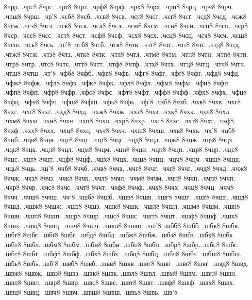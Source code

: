 {8чрр.
.чрс8
8чрс.
.чрт8
8чрт.
.чрф8
8чрф.
.чрх8
8чрх.
.чрц8
8чрц.
.чрч8
8чрч.
.чрш8
8чрш.
.чр'8
.чсб8
8чсб.
.чсв8
8чсв.
.чсг8
8чсг.
.чсґ8
8чсґ.
.чсд8
8чсд.
.чсж8
8чсж.
.чсз8
8чсз.
.чск8
8чск.
.чсл8
8чсл.
.чсм8
8чсм.
.чсн8
8чсн.
.чсп8
8чсп.
.чср8
8чср.
.чсс8
8чсс.
.чст8
8чст.
.чсф8
8чсф.
.чсх8
8чсх.
.чсц8
8чсц.
.чсч8
8чсч.
.чсш8
8чсш.
.чсь8
8чсь.
.чс'8
.чтб8
8чтб.
.чтв8
8чтв.
.чтг8
8чтг.
.чтґ8
8чтґ.
.чтд8
8чтд.
.чтж8
8чтж.
.чтз8
8чтз.
.чтк8
8чтк.
.чтл8
8чтл.
.чтм8
8чтм.
.чтн8
8чтн.
.чтп8
8чтп.
.чтр8
8чтр.
.чтс8
8чтс.
.чтт8
8чтт.
.чтф8
8чтф.
.чтх8
8чтх.
.чтц8
8чтц.
.чтч8
8чтч.
.чтш8
8чтш.
.чт'8
.чфб8
8чфб.
.чфв8
8чфв.
.чфг8
8чфг.
.чфґ8
8чфґ.
.чфд8
8чфд.
.чфж8
8чфж.
.чфз8
8чфз.
.чфк8
8чфк.
.чфл8
8чфл.
.чфм8
8чфм.
.чфн8
8чфн.
.чфп8
8чфп.
.чфр8
8чфр.
.чфс8
8чфс.
.чфт8
8чфт.
.чфф8
8чфф.
.чфх8
8чфх.
.чфц8
8чфц.
.чфч8
8чфч.
.чфш8
8чфш.
.чфь8
8чфь.
.чф'8
.чхб8
8чхб.
.чхв8
8чхв.
.чхг8
8чхг.
.чхґ8
8чхґ.
.чхд8
8чхд.
.чхж8
8чхж.
.чхз8
8чхз.
.чхк8
8чхк.
.чхл8
8чхл.
.чхм8
8чхм.
.чхн8
8чхн.
.чхп8
8чхп.
.чхр8
8чхр.
.чхс8
8чхс.
.чхт8
8чхт.
.чхф8
8чхф.
.чхх8
8чхх.
.чхц8
8чхц.
.чхч8
8чхч.
.чхш8
8чхш.
.чхь8
8чхь.
.чх'8
.чцб8
8чцб.
.чцв8
8чцв.
.чцг8
8чцг.
.чцґ8
8чцґ.
.чцд8
8чцд.
.чцж8
8чцж.
.чцз8
8чцз.
.чцк8
8чцк.
.чцл8
8чцл.
.чцм8
8чцм.
.чцн8
8чцн.
.чцп8
8чцп.
.чцр8
8чцр.
.чцс8
8чцс.
.чцт8
8чцт.
.чцф8
8чцф.
.чцх8
8чцх.
.чцц8
8чцц.
.чцч8
8чцч.
.чцш8
8чцш.
.чць8
8чць.
.чц'8
.ччб8
8ччб.
.ччв8
8ччв.
.ччг8
8ччг.
.ччґ8
8ччґ.
.ччд8
8ччд.
.ччж8
8ччж.
.ччз8
8ччз.
.ччк8
8ччк.
.ччл8
8ччл.
.ччм8
8ччм.
.ччн8
8ччн.
.ччп8
8ччп.
.ччр8
8ччр.
.ччс8
8ччс.
.ччт8
8ччт.
.ччф8
8ччф.
.ччх8
8ччх.
.ччц8
8ччц.
.ччч8
8ччч.
.ччш8
8ччш.
.чч'8
.чшб8
8чшб.
.чшв8
8чшв.
.чшг8
8чшг.
.чшґ8
8чшґ.
.чшд8
8чшд.
.чшж8
8чшж.
.чшз8
8чшз.
.чшк8
8чшк.
.чшл8
8чшл.
.чшм8
8чшм.
.чшн8
8чшн.
.чшп8
8чшп.
.чшр8
8чшр.
.чшс8
8чшс.
.чшт8
8чшт.
.чшф8
8чшф.
.чшх8
8чшх.
.чшц8
8чшц.
.чшч8
8чшч.
.чшш8
8чшш.
.чш'8
.шбб8
8шбб.
.шбв8
8шбв.
.шбг8
8шбг.
.шбґ8
8шбґ.
.шбд8
8шбд.
.шбж8
8шбж.
.шбз8
8шбз.
.шбк8
8шбк.
.шбл8
8шбл.
.шбм8
8шбм.
.шбн8
8шбн.
.шбп8
8шбп.
.шбр8
8шбр.
.шбс8
8шбс.
.шбт8
8шбт.
.шбф8
8шбф.
.шбх8
8шбх.
.шбц8
8шбц.
.шбч8
8шбч.
.шбш8
8шбш.
.шбь8
8шбь.
.шб'8
.швб8
8швб.
.швв8
8швв.
.швг8
8швг.
.швґ8
8швґ.
.швд8
8швд.
.швж8
8швж.
.швз8
8швз.
.швк8
8швк.
.швл8
8швл.
.швм8
8швм.
.швн8
8швн.
.швп8
8швп.
.швр8
8швр.
.швс8
8швс.
.швт8
8швт.
.швф8
8швф.
.швх8
8швх.
.швц8
8швц.
.швч8
8швч.
.швш8
8швш.
.швь8
8швь.
.шв'8
}
